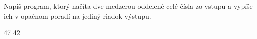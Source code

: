 




Napíš program, ktorý načíta dve medzerou oddelené celé čísla zo vstupu a vypíše ich v opačnom poradí na jediný riadok výstupu.

 47
 42
\koniec



